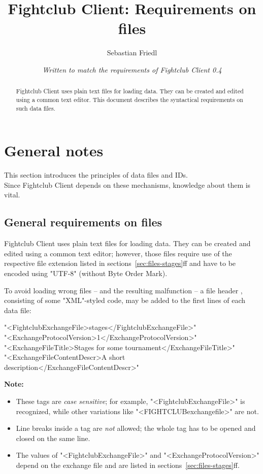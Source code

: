 \documentclass[11pt]{ltxdoc}
\title{\bfseries Fightclub Client: Requirements on files}
\author{Sebastian Friedl}
\date{\itshape Written to match the requirements of Fightclub Client 0.4}
\def\highlight#1{%
    \colorbox{red!15}{#1}%
    \index{\textsf{#1}}}
\begin{document}
    \maketitle
    
    \begin{abstract}\noindent
        Fightclub Client uses plain text files for loading data. They can be created and edited using a common text editor. This document describes the syntactical requirements on such data files.
    \end{abstract}

    \tableofcontents

    
    
    
    
    \clearpage
    \section{General notes}
    This section introduces the principles of data files and IDs. \\
    Since Fightclub Client depends on these mechanisms, knowledge about them is vital.
    
    \subsection{General requirements on files}
    Fightclub Client uses plain text files for loading data. They can be created and edited using a common text editor; however, those files require use of the respective file extension listed in sections~\ref{sec:files-stages}ff and have to be encoded using "UTF-8" (without Byte Order Mark).

    \medskip
    To avoid loading wrong files -- and the resulting malfunction -- a \highlight{file header}, consisting of some "XML"-styled code, may be added to the first lines of each data file:
    
    \smallskip
    "<FightclubExchangeFile>stages</FightclubExchangeFile>" \\
    "<ExchangeProtocolVersion>1</ExchangeProtocolVersion>" \\
    "<ExchangeFileTitle>Stages for some tournament</ExchangeFileTitle>" \\
    "<ExchangeFileContentDescr>A short description</ExchangeFileContentDescr>"
    
    \bigskip
    \textbf{Note:}
    \begin{itemize}
        \item
            These tags are \textit{case sensitive}; for example, "<FightclubExchangeFile>" is recognized, while other variations like "<FIGHTCLUBexchangefile>" are not.
        \item
            Line breaks inside a tag are \textit{not} allowed; the whole tag has to be opened and closed on the same line.
        
        \item
            The values of "<FightclubExchangeFile>" and "<ExchangeProtocolVersion>" depend on the exchange file and are listed in sections~\ref{sec:files-stages}ff.
    \end{itemize} 
    
\end{document}
